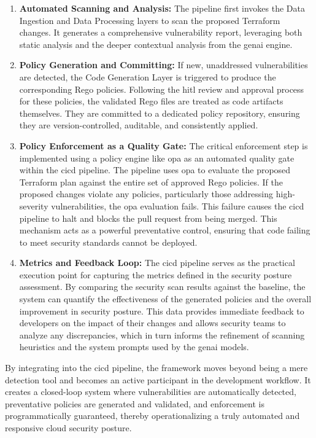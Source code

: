 \begin{enumerate}
    \item \textbf{Automated Scanning and Analysis:} The pipeline first invokes the Data Ingestion and Data Processing layers to scan the proposed Terraform changes. It generates a comprehensive vulnerability report, leveraging both static analysis and the deeper contextual analysis from the \gls{genai} engine.
    \item \textbf{Policy Generation and Committing:} If new, unaddressed vulnerabilities are detected, the Code Generation Layer is triggered to produce the corresponding Rego policies. Following the \gls{hitl} review and approval process for these policies, the validated Rego files are treated as code artifacts themselves. They are committed to a dedicated policy repository, ensuring they are version-controlled, auditable, and consistently applied.
    \item \textbf{Policy Enforcement as a Quality Gate:} The critical enforcement step is implemented using a policy engine like \gls{opa} as an automated quality gate within the \gls{cicd} pipeline. The pipeline uses \gls{opa} to evaluate the proposed Terraform plan against the entire set of approved Rego policies. If the proposed changes violate any policies, particularly those addressing high-severity vulnerabilities, the \gls{opa} evaluation fails. This failure causes the \gls{cicd} pipeline to halt and blocks the pull request from being merged. This mechanism acts as a powerful preventative control, ensuring that code failing to meet security standards cannot be deployed.

    \item \textbf{Metrics and Feedback Loop:} The \gls{cicd} pipeline serves as the practical execution point for capturing the metrics defined in the security posture assessment. By comparing the security scan results against the baseline, the system can quantify the effectiveness of the generated policies and the overall improvement in security posture. This data provides immediate feedback to developers on the impact of their changes and allows security teams to analyze any discrepancies, which in turn informs the refinement of scanning heuristics and the system prompts used by the \gls{genai} models.
\end{enumerate}

By integrating into the \gls{cicd} pipeline, the framework moves beyond being a mere detection tool and becomes an active participant in the development workflow. It creates a closed-loop system where vulnerabilities are automatically detected, preventative policies are generated and validated, and enforcement is programmatically guaranteed, thereby operationalizing a truly automated and responsive cloud security posture.

